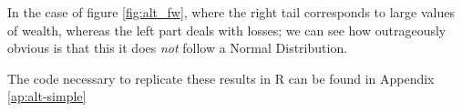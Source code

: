 In the case of figure \ref{fig:alt_fw}, where the right tail corresponds to large values of wealth, whereas the left part deals with losses; we can see how outrageously obvious is that this it does \textit{not} follow a Normal Distribution.

The code necessary to replicate these results in R can be found in Appendix \ref{ap:alt-simple}
